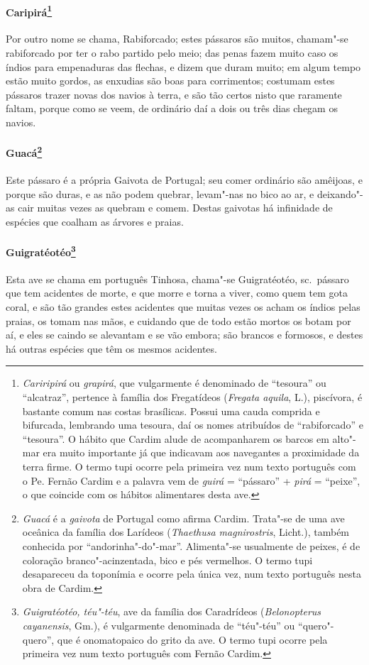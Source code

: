 \paragraph{Caripirá\footnote{ \textit{Cariripirá} ou \textit{grapirá}, 
que vulgarmente é denominado de ``tesoura'' ou ``alcatraz'', pertence à
família dos Fregatídeos (\textit{Fregata aquila}, L.), piscívora, é
bastante comum nas costas brasílicas. Possui uma cauda comprida e
bifurcada, lembrando uma tesoura, daí os nomes atribuídos de
``rabiforcado'' e ``tesoura''. O hábito que Cardim alude de acompanharem os
barcos em alto"-mar era muito importante já que indicavam aos navegantes
a proximidade da terra firme. O termo tupi ocorre pela primeira vez num
texto português com o Pe. Fernão Cardim e a palavra vem de
\textit{guirá} = ``pássaro'' + \textit{pirá} = ``peixe'', o que coincide
com os hábitos alimentares desta ave.}} Por outro nome se
chama, Rabiforcado; estes pássaros são muitos, chamam"-se rabiforcado
por ter o rabo partido pelo meio; das penas fazem muito caso os índios
para empenaduras das flechas, e dizem que duram muito; em algum tempo
estão muito gordos, as enxudias são boas para corrimentos; costumam
estes pássaros trazer novas dos navios à terra, e são tão certos nisto
que raramente faltam, porque como se veem, de ordinário daí a dois ou
três dias chegam os navios.

\paragraph{Guacá\footnote{ \textit{Guacá} é a \textit{gaivota} de
Portugal como afirma Cardim. Trata"-se de uma ave oceânica da família
dos Larídeos (\textit{Thaethusa magnirostris}, Licht.), também
conhecida por ``andorinha"-do"-mar''. Alimenta"-se usualmente de peixes, é
de coloração branco"-acinzentada, bico e pés vermelhos. O termo tupi
desapareceu da toponímia e ocorre pela única vez, num texto português
nesta obra de Cardim.}} Este pássaro é a própria Gaivota de
Portugal; seu comer ordinário são amêijoas, e porque são duras, e as
não podem quebrar, levam"-nas no bico ao ar, e deixando"-as cair muitas
vezes as quebram e comem. Destas gaivotas há infinidade de espécies que
coalham as árvores e praias.

\paragraph{Guigratéotéo\footnote{ \textit{Guigratéotéo, téu"-téu}, ave
da família dos Caradrídeos (\textit{Belonopterus cayanensis}, Gm.), é
vulgarmente denominada de ``téu"-téu'' ou ``quero"-quero'', que é
onomatopaico do grito da ave. O termo tupi ocorre pela primeira vez num
texto português com Fernão Cardim.}} Esta ave se chama em
português Tinhosa, chama"-se Guigratéotéo, sc.~pássaro que tem
acidentes de morte, e que morre e torna a viver, como quem tem gota
coral, e são tão grandes estes acidentes que muitas vezes os acham os
índios pelas praias, os tomam nas mãos, e cuidando que de todo estão
mortos os botam por aí, e eles se caindo se alevantam e se vão embora;
são brancos e formosos, e destes há outras espécies que têm os mesmos acidentes.

